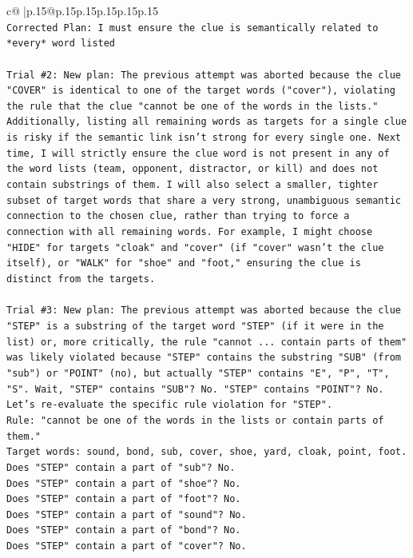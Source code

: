 \documentclass{article}
\begin{document}
{\begin{supertabular}{c@{$\;$}|p{.15\linewidth}@{}p{.15\linewidth}p{.15\linewidth}p{.15\linewidth}p{.15\linewidth}p{.15\linewidth}}
{{{\\ 
\texttt{Corrected Plan: I must ensure the clue is semantically related to *every* word listed} \\
\\ 
\texttt{Trial \#2: New plan: The previous attempt was aborted because the clue "COVER" is identical to one of the target words ("cover"), violating the rule that the clue "cannot be one of the words in the lists." Additionally, listing all remaining words as targets for a single clue is risky if the semantic link isn't strong for every single one. Next time, I will strictly ensure the clue word is not present in any of the word lists (team, opponent, distractor, or kill) and does not contain substrings of them. I will also select a smaller, tighter subset of target words that share a very strong, unambiguous semantic connection to the chosen clue, rather than trying to force a connection with all remaining words. For example, I might choose "HIDE" for targets "cloak" and "cover" (if "cover" wasn't the clue itself), or "WALK" for "shoe" and "foot," ensuring the clue is distinct from the targets.} \\
\\ 
\texttt{Trial \#3: New plan: The previous attempt was aborted because the clue "STEP" is a substring of the target word "STEP" (if it were in the list) or, more critically, the rule "cannot ... contain parts of them" was likely violated because "STEP" contains the substring "SUB" (from "sub") or "POINT" (no), but actually "STEP" contains "E", "P", "T", "S". Wait, "STEP" contains "SUB"? No. "STEP" contains "POINT"? No.} \\
\texttt{Let's re{-}evaluate the specific rule violation for "STEP".} \\
\texttt{Rule: "cannot be one of the words in the lists or contain parts of them."} \\
\texttt{Target words: sound, bond, sub, cover, shoe, yard, cloak, point, foot.} \\
\texttt{Does "STEP" contain a part of "sub"? No.} \\
\texttt{Does "STEP" contain a part of "shoe"? No.} \\
\texttt{Does "STEP" contain a part of "foot"? No.} \\
\texttt{Does "STEP" contain a part of "sound"? No.} \\
\texttt{Does "STEP" contain a part of "bond"? No.} \\
\texttt{Does "STEP" contain a part of "cover"? No.} \\
}}}
\end{supertabular}}
\end{document}
